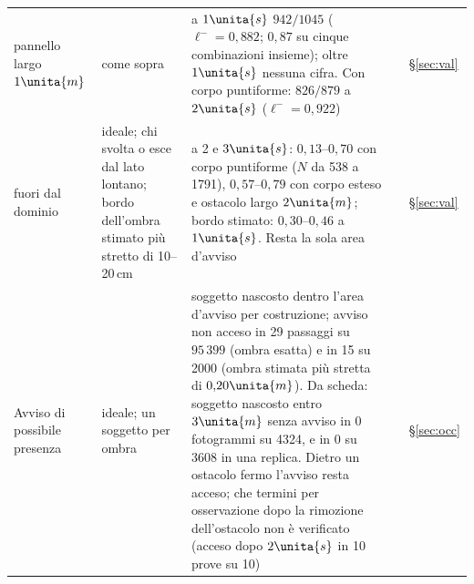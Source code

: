 \begin{table}[p]
\begin{tabularx}{\textwidth}{@{}>{\RaggedRight\arraybackslash}p{2.8cm}>{\RaggedRight\arraybackslash}p{4.1cm}L>{\RaggedRight\arraybackslash}p{1.2cm}>{\RaggedRight\arraybackslash}p{1.05cm}@{}}
\quad pannello largo $1\unita{m}$ & come sopra & a $1\unita{s}$ $942/1045$ ($\ell^-=0{,}882$; $0{,}87$ su cinque combinazioni insieme); oltre $1\unita{s}$ nessuna cifra. Con corpo puntiforme: $826/879$ a $2\unita{s}$ ($\ell^-=0{,}922$) &  & \S\ref{sec:val}\\
\quad fuori dal dominio & ideale; chi svolta o esce dal lato lontano; bordo dell'ombra stimato più stretto di 10--20\,cm & a 2 e $3\unita{s}$: $0{,}13$--$0{,}70$ con corpo puntiforme ($N$ da 538 a 1791), $0{,}57$--$0{,}79$ con corpo esteso e ostacolo largo $2\unita{m}$; bordo stimato: $0{,}30$--$0{,}46$ a $1\unita{s}$. Resta la sola area d'avviso &  & \S\ref{sec:val}\\
Avviso di possibile presenza & ideale; un soggetto per ombra & soggetto nascosto dentro l'area d'avviso per costruzione; avviso non acceso in 29 passaggi su $95\,399$ (ombra esatta) e in 15 su 2000 (ombra stimata più stretta di $0{,}20\unita{m}$). Da scheda: soggetto nascosto entro $3\unita{m}$ senza avviso in 0 fotogrammi su 4324, e in 0 su 3608 in una replica. Dietro un ostacolo fermo l'avviso resta acceso; che termini per osservazione dopo la rimozione dell'ostacolo non è verificato (acceso dopo $2\unita{s}$ in 10 prove su 10) &  & \S\ref{sec:occ}\\
\bottomrule
\end{tabularx}
\end{table}

